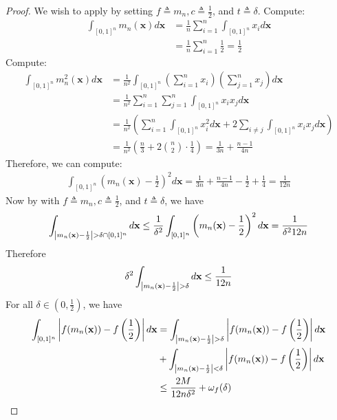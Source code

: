 \documentclass{report}
\begin{document}
\begin{proof}
We wish to apply  by setting $f\triangleq m_n,c\triangleq \frac{1}{2}$, and $t \triangleq \delta$. Compute:  
\begin{align*}
\int_{[0,1]^n }m_n(\textbf{x})d\textbf{x} &= \frac{1}{n} \sum_{i=1}^n \int_{[0,1]^n} x_i d\textbf{x} \\
&=\frac{1}{n} \sum_{i=1}^n \frac{1}{2} = \frac{1}{2}
\end{align*}
Compute: 
\begin{align*}
\int_{[0,1]^n} m_n^2(\textbf{x})d\textbf{x} &= \frac{1}{n^2} \int_{[0,1]^n}\left(\sum_{i=1}^n x_i \right) \left(\sum_{j=1}^n x_j \right) d\textbf{x} \\
&=\frac{1}{n^2} \sum_{i=1}^n \sum_{j=1}^n \int_{[0,1]^n}x_ix_j d\textbf{x} \\
&=\frac{1}{n^2} \left(\sum_{i=1}^n \int_{[0,1]^n} x_i^2 d \textbf{x} + 2\sum_{i \neq j}\int_{[0,1]^n}x_ix_j d\textbf{x}   \right) \\
&=\frac{1}{n^2} \left( \frac{n}{3}+2 \binom{n}{2} \cdot \frac{1}{4}  \right) = \frac{1}{3n}+ \frac{n-1}{4n}
\end{align*}
Therefore, we can compute:
\begin{align*}
\int_{[0,1]^n} \left(m_n(\textbf{x}) - \frac{1}{2} \right)^2 d \textbf{x}  = \frac{1}{3n} + \frac{n-1}{4n} - \frac{1}{2} + \frac{1}{4} = \frac{1}{12n}
\end{align*}
Now by  with $f\triangleq m_n,c\triangleq \frac{1}{2}$, and $t \triangleq \delta$, we have 
\begin{align*}
\int_{\abso{m_n(\textbf{x})-\frac{1}{2}}> \delta \cap  [0,1]^n}  d \textbf{x} \leq \frac{1}{\delta^2} \int_{[0,1]^n} \left( m_n(\textbf{x})- \frac{1}{2} \right)^2  d \textbf{x}= \frac{1}{\delta^212n} 
\end{align*}
Therefore 
\begin{align*}
\delta^2 \int_{\left|m_n(\textbf{x})- \frac{1}{2}\right| > \delta} d\textbf{x}\leq \frac{1}{12n}
\end{align*}
For all $\delta \in (0,\frac{1}{2})$, we have 
\begin{align*}
  \int_{[0,1]^n} \abso{f(m_n(\textbf{x})) - f\left(\frac{1}{2} \right) } d \textbf{x} &= \int_{\abso{m_n(\textbf{x}) - \frac{1}{2}}> \delta}  \abso{f(m_n(\textbf{x})) - f\left(\frac{1}{2} \right) } d \textbf{x} \\
  &+ \int_{\abso{m_n(\textbf{x})-\frac{1}{2}} < \delta} \abso{f(m_n(\textbf{x}))- f \left(\frac{1}{2} \right)} d\textbf{x} \\
  &\leq \frac{2M}{12n \delta^2}  + \omega_f (\delta)
\end{align*}
\end{proof}
\end{document}
